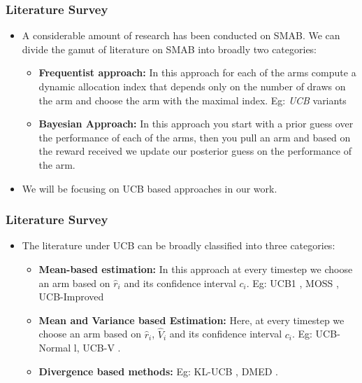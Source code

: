 \begin{frame}
\frametitle{Literature Survey}
\begin{itemize}
\item<1-> A considerable amount of research has been conducted on SMAB. We can divide the gamut of literature on SMAB into broadly two categories:
\begin{itemize}
\item<2-> \textbf{Frequentist approach:} In this approach for each of the arms compute a dynamic allocation index that depends only on the number of draws on the arm and choose the arm with the maximal index. Eg:  \emph{UCB} variants
\item<3-> \textbf{Bayesian Approach:} In this approach you start with a prior guess over the performance of each of the arms, then you pull an arm and based on the reward received we update our posterior guess on the performance of the arm. 
\end{itemize} 
\item<4-> We will be focusing on UCB based approaches in our work.
\end{itemize}
\end{frame}

\begin{frame}
\frametitle{Literature Survey}
\begin{itemize}
\item<1-> The literature under UCB can be broadly classified into three categories:
\begin{itemize}
\item<2-> \textbf{Mean-based estimation: } In this approach at every timestep we choose an arm based on $\hat{r}_i$ and its confidence interval $c_i$. Eg: UCB1 \cite{auer2002finite}, MOSS \cite{audibert2009minimax}, UCB-Improved \cite{auer2010ucb}
\item<3-> \textbf{Mean and Variance based Estimation: } Here, at every timestep we choose an arm based on $\hat{r}_i$, $\hat{V}_i$ and its confidence interval $c_i$. Eg: UCB-Normal \cite{auer2002finite}l, UCB-V \cite{audibert2009exploration}.
\item<4-> \textbf{Divergence based methods: } Eg: KL-UCB \cite{garivier2011kl}, DMED \cite{honda2010asymptotically}.
\end{itemize}
\end{itemize} 
\end{frame}

